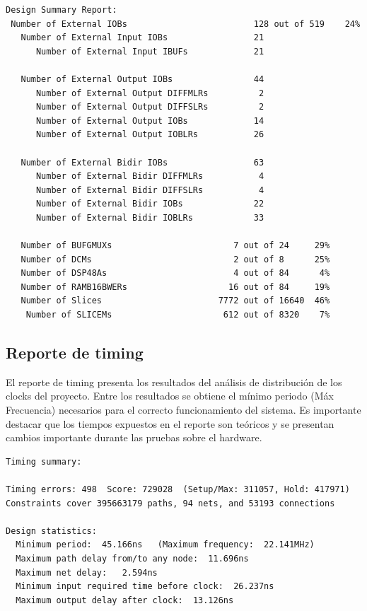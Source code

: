 \begin{lstlisting}[frame=single,caption={Resultado de PAR - ORPSoC},label={lst:salidas},breaklines]
Design Summary Report:
 Number of External IOBs                         128 out of 519    24%
   Number of External Input IOBs                 21
      Number of External Input IBUFs             21

   Number of External Output IOBs                44
      Number of External Output DIFFMLRs          2
      Number of External Output DIFFSLRs          2
      Number of External Output IOBs             14
      Number of External Output IOBLRs           26

   Number of External Bidir IOBs                 63
      Number of External Bidir DIFFMLRs           4
      Number of External Bidir DIFFSLRs           4
      Number of External Bidir IOBs              22
      Number of External Bidir IOBLRs            33

   Number of BUFGMUXs                        7 out of 24     29%
   Number of DCMs                            2 out of 8      25%
   Number of DSP48As                         4 out of 84      4%
   Number of RAMB16BWERs                    16 out of 84     19%
   Number of Slices                       7772 out of 16640  46%
    Number of SLICEMs                      612 out of 8320    7%
\end{lstlisting}

		\subsection{Reporte de timing}	

El reporte de timing presenta los resultados del análisis de distribución de los clocks del proyecto. Entre los resultados se obtiene el mínimo
periodo (Máx Frecuencia) necesarios para el correcto funcionamiento del sistema. Es importante destacar que los tiempos expuestos en el reporte son
teóricos y se presentan cambios importante durante las pruebas sobre el hardware. 

\begin{lstlisting}[frame=single,caption={Reporte timing - ORPSoC},label={lst:salidas},breaklines]
Timing summary:

Timing errors: 498  Score: 729028  (Setup/Max: 311057, Hold: 417971)
Constraints cover 395663179 paths, 94 nets, and 53193 connections

Design statistics:
  Minimum period:  45.166ns   (Maximum frequency:  22.141MHz)
  Maximum path delay from/to any node:  11.696ns
  Maximum net delay:   2.594ns
  Minimum input required time before clock:  26.237ns
  Maximum output delay after clock:  13.126ns
\end{lstlisting}

